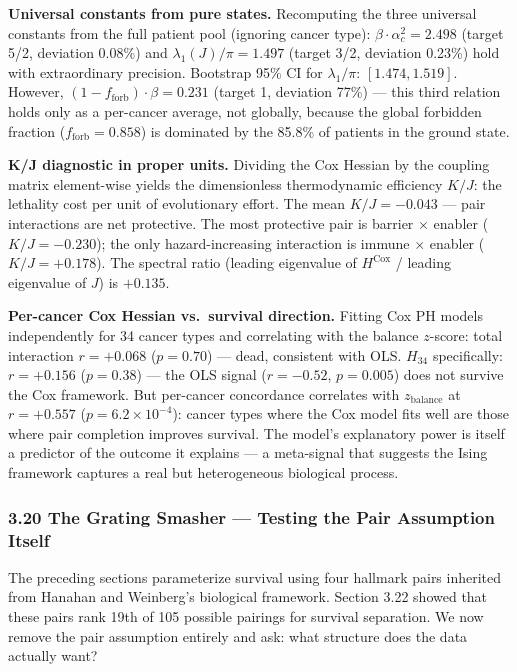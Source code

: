 \documentclass[
  11pt,
]{article}
\begin{document}
\textbf{Universal constants from pure states.} Recomputing the three
universal constants from the full patient pool (ignoring cancer type):
\(\beta \cdot \alpha_c^2 = 2.498\) (target 5/2, deviation 0.08\%) and
\(\lambda_1(J)/\pi = 1.497\) (target 3/2, deviation 0.23\%) hold with
extraordinary precision. Bootstrap 95\% CI for \(\lambda_1/\pi\):
\([1.474, 1.519]\). However,
\((1 - f_\mathrm{forb}) \cdot \beta = 0.231\) (target 1, deviation 77\%)
--- this third relation holds only as a per-cancer average, not
globally, because the global forbidden fraction
(\(f_\mathrm{forb} = 0.858\)) is dominated by the 85.8\% of patients in
the ground state.

\textbf{K/J diagnostic in proper units.} Dividing the Cox Hessian by the
coupling matrix element-wise yields the dimensionless thermodynamic
efficiency \(K/J\): the lethality cost per unit of evolutionary effort.
The mean \(K/J = -0.043\) --- pair interactions are net protective. The
most protective pair is barrier \(\times\) enabler (\(K/J = -0.230\));
the only hazard-increasing interaction is immune \(\times\) enabler
(\(K/J = +0.178\)). The spectral ratio (leading eigenvalue of
\(H^{\text{Cox}}\) / leading eigenvalue of \(J\)) is \(+0.135\).

\textbf{Per-cancer Cox Hessian vs.~survival direction.} Fitting Cox PH
models independently for 34 cancer types and correlating with the
balance \(z\)-score: total interaction \(r = +0.068\) (\(p = 0.70\)) ---
dead, consistent with OLS. \(H_{34}\) specifically: \(r = +0.156\)
(\(p = 0.38\)) --- the OLS signal (\(r = -0.52\), \(p = 0.005\)) does
not survive the Cox framework. But per-cancer concordance correlates
with \(z_\mathrm{balance}\) at \(r = +0.557\)
(\(p = 6.2 \times 10^{-4}\)): cancer types where the Cox model fits well
are those where pair completion improves survival. The model's
explanatory power is itself a predictor of the outcome it explains --- a
meta-signal that suggests the Ising framework captures a real but
heterogeneous biological process.

\subsubsection{3.20 The Grating Smasher --- Testing the Pair Assumption
Itself}\label{the-grating-smasher-testing-the-pair-assumption-itself}

The preceding sections parameterize survival using four hallmark pairs
inherited from Hanahan and Weinberg's biological framework. Section 3.22
showed that these pairs rank 19th of 105 possible pairings for survival
separation. We now remove the pair assumption entirely and ask: what
structure does the data actually want?
\end{document}

